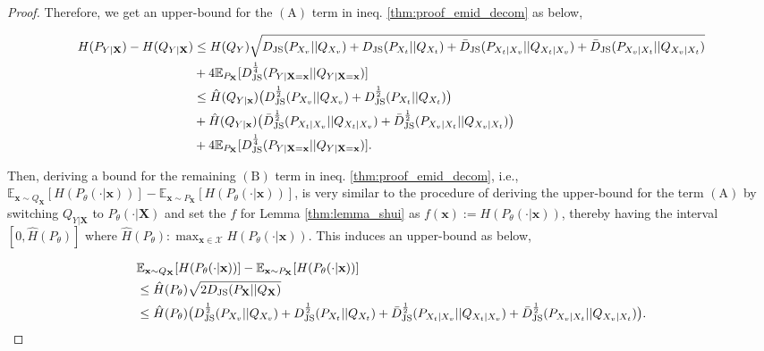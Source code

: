 \begin{proof}
Therefore, we get an upper-bound for the $(\text{A})$ term in ineq. \eqref{thm:proof_emid_decom} as below,

\begin{equation*} \label{thm:bound_final1}
\begin{split}
    H(P_{Y|\mathbf{X}})-H(Q_{Y|\mathbf{X}}) &\leq H(Q_Y) \sqrt{D_{\rm JS}(P_{X_{v}}||Q_{X_{v}})+D_{\rm JS}(P_{X_{t}}||Q_{X_{t}})+ \bar{D}_{\rm JS}(P_{X_{t}|X_{v}}||Q_{X_{t}|X_{v}}) + \bar{D}_{\rm JS}(P_{X_{v}|X_{t}}||Q_{X_{v}|X_{t}}) } \\
    &+4 \mathbb{E}_{P_{\mathbf{X}}}[D^{\frac{1}{4}}_{\rm JS}(P_{Y|\mathbf{X}=\mathbf{x}} || Q_{Y|\mathbf{X}=\mathbf{x}})] \\
    &\leq \hat{H}(Q_{Y|\mathbf{x}}) \big( D^{\frac{1}{2}}_{\rm JS}(P_{X_{v}}||Q_{X_{v}})+D^{\frac{1}{2}}_{\rm JS}(P_{X_{t}}||Q_{X_{t}})\big)\\
    &+ \hat{H}(Q_{Y|\mathbf{x}}) \big( \bar{D}^{\frac{1}{2}}_{\rm JS}(P_{X_{t}|X_{v}}||Q_{X_{t}|X_{v}}) + \bar{D}^{\frac{1}{2}}_{\rm JS}(P_{X_{v}|X_{t}}||Q_{X_{v}|X_{t}}) \big) \\
    &+4\mathbb{E}_{P_{\mathbf{X}}}[D^{\frac{1}{4}}_{\rm JS}(P_{Y|\mathbf{X}=\mathbf{x}} || Q_{Y|\mathbf{X}=\mathbf{x}})].
\end{split}
\end{equation*}

Then, deriving a bound for the remaining $(\text{B})$ term in ineq. \eqref{thm:proof_emid_decom}, i.e., $\mathbb{E}_{\mathbf{x}\sim Q_{\mathbf{X}}}[H(P_{\theta}(\cdot|\mathbf{x}))] - \mathbb{E}_{\mathbf{x}\sim P_{\mathbf{X}}}[H(P_{\theta}(\cdot|\mathbf{x}))]$, is very similar to the procedure of deriving the upper-bound for the term $(\text{A})$ by switching $Q_{Y|\mathbf{X}}$ to $P_{\theta}(\cdot|\mathbf{X})$ and set the $f$ for Lemma \ref{thm:lemma_shui} as $f(\mathbf{x}):=H(P_{\theta}(\cdot|\mathbf{x}))$, thereby having the interval $[0,\hat{H}(P_{\theta})]$ where $\hat{H}(P_{\theta}):\max_{\mathbf{x}\in\mathcal{X}} H(P_{\theta}(\cdot|\mathbf{x}))$. This induces an upper-bound as below,

\begin{equation} \label{thm:bound_final2}
\begin{split}
    &\mathbb{E}_{\mathbf{x}\sim Q_{\mathbf{X}}}[H(P_{\theta}(\cdot|\mathbf{x}))] - \mathbb{E}_{\mathbf{x}\sim P_{\mathbf{X}}}[H(P_{\theta}(\cdot|\mathbf{x}))] \\
    &\leq \hat{H}(P_{\theta}) \sqrt{2 D_{\rm JS}(P_{\mathbf{X}}||Q_{\mathbf{X}})}\\
    &\leq \hat{H}(P_{\theta})  \big( D^{\frac{1}{2}}_{\rm JS}(P_{X_{v}}||Q_{X_{v}})+D^{\frac{1}{2}}_{\rm JS}(P_{X_{t}}||Q_{X_{t}}) + \bar{D}^{\frac{1}{2}}_{\rm JS}(P_{X_{t}|X_{v}}||Q_{X_{t}|X_{v}}) + \bar{D}^{\frac{1}{2}}_{\rm JS}(P_{X_{v}|X_{t}}||Q_{X_{v}|X_{t}}) \big).
\end{split}
\end{equation}


\end{proof}
